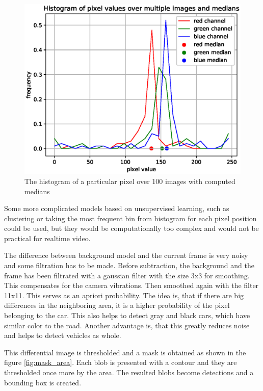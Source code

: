\documentclass[a4paper,12pt,titlepage, twoside]{article}
\numberwithin{figure}{section}
\begin{document}
\begin{figure}[h]
\centering
\includegraphics[width=1\linewidth]{fig/pixel_hist.eps}
\caption{The histogram of a particular pixel over 100 images with computed medians}
\label{fig:pixel_hist}
\end{figure}

Some more complicated models based on unsupervised learning, such as clustering or taking the most frequent bin from histogram for each pixel position could be used, but they would be computationally too complex and would not be practical for realtime video.

The difference between background model and the current frame is very noisy and some filtration has to be made. Before subtraction, the background and the frame has been filtrated with a gaussian filter with the size 3x3 for smoothing. This compensates for the camera vibrations. Then smoothed again with the filter 11x11. This serves as an apriori probability. The idea is, that if there are big differences in the neighboring area, it is a higher probability of the pixel belonging to the car. This also helps to detect gray and black cars, which have similar color to the road. Another advantage is, that this greatly reduces noise and helps to detect vehicles as whole.

This differential image is thresholded and a mask is obtained as shown in the figure \ref{fig:mask_area}. Each blob is presented with a contour and they are thresholded once more by the area. The resulted blobs become detections and a bounding box is created.
\end{document}

